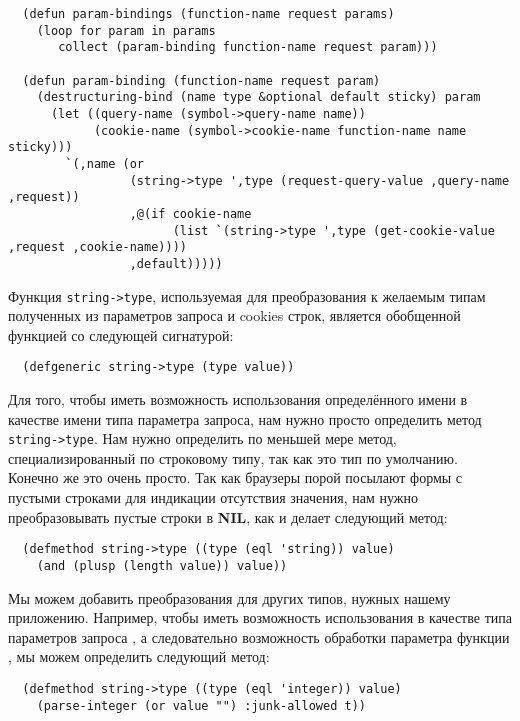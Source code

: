 \begin{lstlisting}
  (defun param-bindings (function-name request params)
    (loop for param in params
       collect (param-binding function-name request param)))

  (defun param-binding (function-name request param)
    (destructuring-bind (name type &optional default sticky) param
      (let ((query-name (symbol->query-name name))
            (cookie-name (symbol->cookie-name function-name name sticky)))
        `(,name (or 
                 (string->type ',type (request-query-value ,query-name ,request))
                 ,@(if cookie-name
                       (list `(string->type ',type (get-cookie-value ,request ,cookie-name))))
                 ,default)))))
\end{lstlisting}

Функция \lstinline!string->type!, используемая для преобразования к желаемым типам
полученных из параметров запроса и cookies строк, является обобщенной функцией со
следующей сигнатурой:

\begin{lstlisting}
  (defgeneric string->type (type value))
\end{lstlisting}

Для того, чтобы иметь возможность использования определённого имени в качестве имени типа
параметра запроса, нам нужно просто определить метод \lstinline!string->type!. Нам нужно
определить по меньшей мере метод, специализированный по строковому типу, так как это тип
по умолчанию. Конечно же это очень просто. Так как браузеры порой посылают формы с пустыми
строками для индикации отсутствия значения, нам нужно преобразовывать пустые строки в
\textbf{NIL}, как и делает следующий метод:

\begin{lstlisting}
  (defmethod string->type ((type (eql 'string)) value)
    (and (plusp (length value)) value))
\end{lstlisting}

Мы можем добавить преобразования для других типов, нужных нашему приложению. Например,
чтобы иметь возможность использования в качестве типа параметров запроса , а
следовательно возможность обработки параметра  функции , мы
можем определить следующий метод:

\begin{lstlisting}
  (defmethod string->type ((type (eql 'integer)) value)
    (parse-integer (or value "") :junk-allowed t))
\end{lstlisting}

